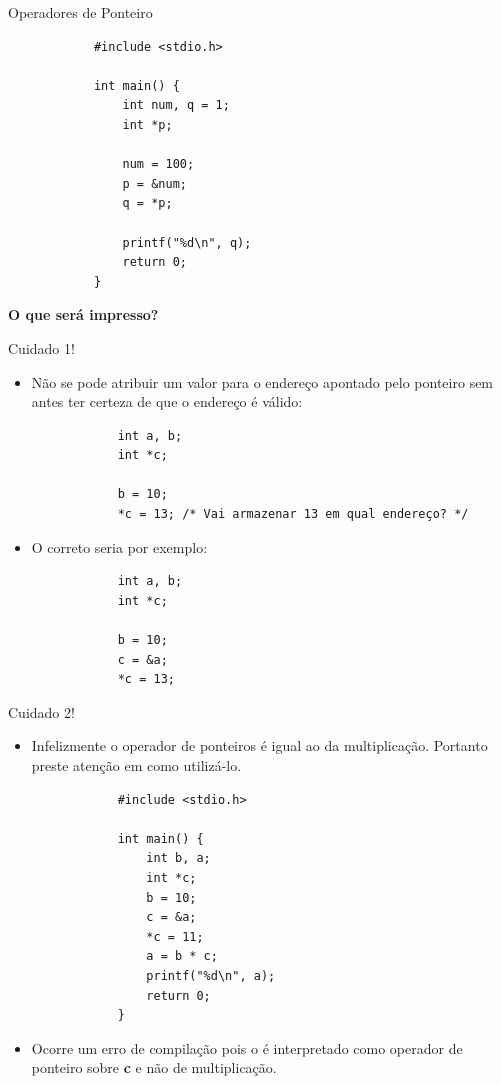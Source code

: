 \documentclass[handout]{beamer}
\begin{document}
\begin{frame}[fragile]{Operadores de Ponteiro}
    \begin{small}
        \begin{verbatim}
            #include <stdio.h>

            int main() {
                int num, q = 1;
                int *p;

                num = 100;
                p = &num;
                q = *p;

                printf("%d\n", q);
                return 0;
            }
        \end{verbatim}
    \end{small}
    \textbf{O que será impresso?}

\end{frame}



\begin{frame}[fragile]{Cuidado 1!}
    \begin{itemize}[<+->]
        \item Não se pode atribuir um valor para o endereço apontado
        pelo ponteiro sem antes ter certeza de que o endereço é válido:
        \begin{verbatim}
            int a, b;
            int *c;

            b = 10;
            *c = 13; /* Vai armazenar 13 em qual endereço? */
        \end{verbatim}
        \item O correto seria por exemplo:
        \begin{verbatim}
            int a, b;
            int *c;

            b = 10;
            c = &a;
            *c = 13;
        \end{verbatim}
    \end{itemize}
\end{frame}

\begin{frame}[fragile]{Cuidado 2!}
    \begin{itemize}
        \item Infelizmente o operador {\bf *} de ponteiros é igual ao da multiplicação.
        Portanto preste atenção em como utilizá-lo.
        \begin{verbatim}
            #include <stdio.h>

            int main() {
                int b, a;
                int *c;
                b = 10;
                c = &a;
                *c = 11;
                a = b * c;
                printf("%d\n", a);
                return 0;
            }
        \end{verbatim}

        \item Ocorre um erro de compilação pois o {\bf *} é interpretado como operador de
        ponteiro sobre {\bf c} e não de multiplicação.
    \end{itemize}
\end{frame}
\end{document}
